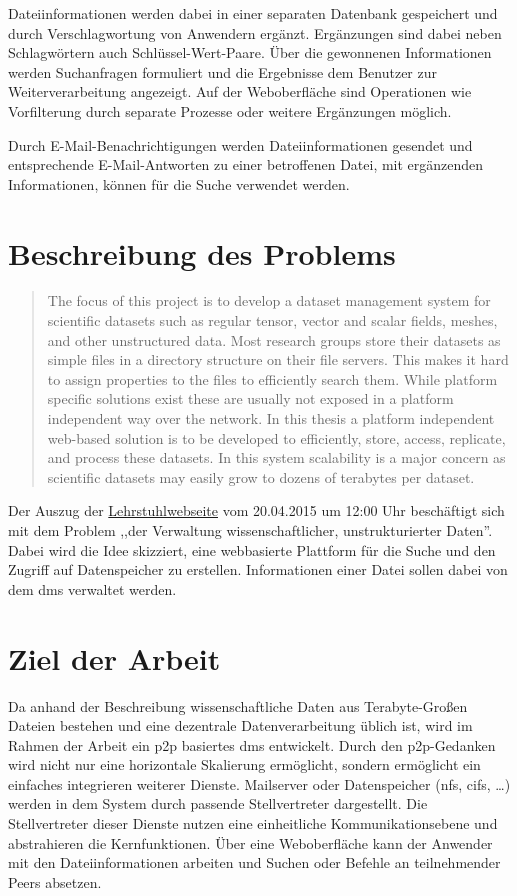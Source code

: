 \documentclass[oneside, ngerman, toc=bibliography,bibliography=totoc,listof=entryprefix, open=right,numbers=noenddot,fontsize=12pt]{scrbook}
\begin{document}
Dateiinformationen werden dabei in einer separaten Datenbank gespeichert und durch Verschlagwortung von Anwendern ergänzt. Ergänzungen sind dabei neben Schlagwörtern auch Schlüssel-Wert-Paare. Über die gewonnenen Informationen werden Suchanfragen formuliert und die Ergebnisse dem Benutzer zur Weiterverarbeitung angezeigt. Auf der Weboberfläche sind Operationen wie Vorfilterung durch separate Prozesse oder weitere Ergänzungen möglich.

Durch E-Mail-Benachrichtigungen werden Dateiinformationen gesendet und entsprechende E-Mail-Antworten zu einer betroffenen Datei, mit ergänzenden Informationen, können für die Suche verwendet werden.


\section{Beschreibung des Problems}


\begin{quote}
The focus of this project is to develop a dataset management system for scientific datasets such as regular tensor, vector and scalar fields, meshes, and other unstructured data.
Most research groups store their datasets as simple files in a directory structure on their file servers. This makes it hard to assign properties to the files to efficiently search them. While platform specific solutions exist these are usually not exposed in a platform independent way over the network.
In this thesis a platform independent web-based solution is to be developed to efficiently, store, access, replicate, and process these datasets. In this system scalability is a major concern as scientific datasets may easily grow to dozens of terabytes per dataset. 
\end{quote}


Der Auszug der \href{http://hpc.uni-due.de/theses.html}{Lehrstuhlwebseite} vom 20.04.2015 um 12:00 Uhr beschäftigt sich mit dem Problem ,,der Verwaltung wissenschaftlicher, unstrukturierter Daten''. Dabei wird die Idee skizziert, eine webbasierte Plattform für die Suche und den Zugriff auf Datenspeicher zu erstellen. Informationen einer Datei sollen dabei von dem  \acrfull{dms} verwaltet werden.


\section{Ziel der Arbeit}
Da anhand der Beschreibung wissenschaftliche Daten aus Terabyte-Großen Dateien bestehen und eine dezentrale Datenverarbeitung üblich ist,  
wird im Rahmen der Arbeit ein  \acrfull{p2p}  basiertes \acrshort{dms} entwickelt. Durch den \acrshort{p2p}-Gedanken wird nicht nur eine horizontale Skalierung ermöglicht, sondern ermöglicht ein einfaches integrieren weiterer Dienste. Mailserver oder Datenspeicher (\acrfull{nfs}, \acrfull{cifs}, \ldots) werden in dem System durch passende Stellvertreter dargestellt. Die Stellvertreter dieser Dienste nutzen eine einheitliche Kommunikationsebene \cite{coulouris2002verteilte} und abstrahieren die Kernfunktionen. Über eine Weboberfläche kann der Anwender mit den Dateiinformationen arbeiten und Suchen oder Befehle an teilnehmender Peers absetzen.
\end{document}
